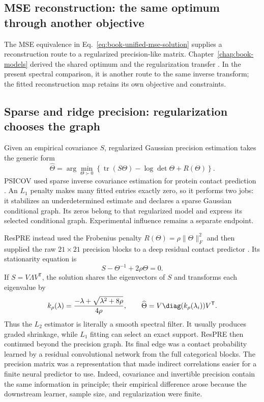 \subsection{MSE reconstruction: the same optimum through another objective}

The MSE equivalence in Eq.~\ref{eq:book-unified-mse-solution} supplies a reconstruction route to a
regularized precision-like matrix.  Chapter~\ref{chap:book-models} derived the shared optimum and
the regularization transfer \cite{dauparas2019}.  In the present spectral comparison, it is another
route to the same inverse transform; the fitted reconstruction map retains its own objective and
constraints.

\subsection{Sparse and ridge precision: regularization chooses the graph}

Given an empirical covariance $S$, regularized Gaussian precision estimation takes the generic
form
\begin{equation}
\widehat\Theta
=\arg\min_{\Theta\succ0}
\left\{\operatorname{tr}(S\Theta)-\log\det\Theta+R(\Theta)\right\}.
\label{eq:regularized-gaussian-precision}
\end{equation}
PSICOV used sparse inverse covariance estimation for protein contact prediction
\cite{jones2012}.  An $L_1$ penalty makes many fitted entries exactly zero, so it performs two jobs:
it stabilizes an underdetermined estimate and declares a sparse Gaussian conditional graph.  Its
zeros belong to that regularized model and express its selected conditional graph.  Experimental
influence remains a separate endpoint.

ResPRE instead used the Frobenius penalty $R(\Theta)=\rho\|\Theta\|_F^2$ and then supplied the raw
$21\times21$ precision blocks to a deep residual contact predictor \cite{li2019respre}.  Its
stationarity equation is
\begin{equation}
S-\Theta^{-1}+2\rho\Theta=0.
\label{eq:respre-stationarity}
\end{equation}
If $S=V\Lambda V^{\mathsf T}$, the solution shares the eigenvectors of $S$ and transforms each
eigenvalue by
\begin{equation}
k_\rho(\lambda)
=\frac{-\lambda+\sqrt{\lambda^2+8\rho}}{4\rho},
\qquad
\widehat\Theta=V\diag(k_\rho(\lambda_i))V^{\mathsf T}.
\label{eq:respre-ridge-filter}
\end{equation}
Thus the $L_2$ estimator is literally a smooth spectral filter.  It usually produces graded
shrinkage, while $L_1$ fitting can select an exact support.  ResPRE then continued beyond the
precision graph.
Its final edge was a contact probability learned by a residual convolutional network from the
full categorical blocks.  The precision matrix was a representation that made indirect
correlations easier for a finite neural predictor to use.  Indeed, covariance and invertible
precision contain the same information in principle; their empirical difference arose because
the downstream learner, sample size, and regularization were finite.

